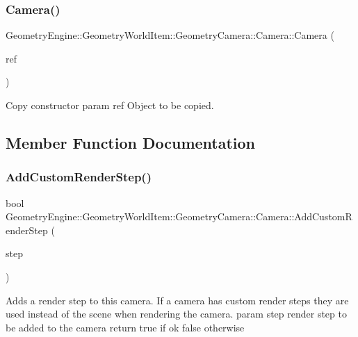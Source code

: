 \subsubsection{\texorpdfstring{Camera()}{Camera()}\hspace{0.1cm}{\footnotesize\ttfamily [2/2]}}
{\footnotesize\ttfamily Geometry\+Engine\+::\+Geometry\+World\+Item\+::\+Geometry\+Camera\+::\+Camera\+::\+Camera (\begin{DoxyParamCaption}\item[{const \mbox{\hyperlink{class_geometry_engine_1_1_geometry_world_item_1_1_geometry_camera_1_1_camera}{Camera}} \&}]{ref }\end{DoxyParamCaption})}

Copy constructor param ref Object to be copied. 

\subsection{Member Function Documentation}
\mbox{\label{class_geometry_engine_1_1_geometry_world_item_1_1_geometry_camera_1_1_camera_a548c5c566cc732b7d0c00aca94cdcbbe}} 
\subsubsection{\texorpdfstring{AddCustomRenderStep()}{AddCustomRenderStep()}}
{\footnotesize\ttfamily bool Geometry\+Engine\+::\+Geometry\+World\+Item\+::\+Geometry\+Camera\+::\+Camera\+::\+Add\+Custom\+Render\+Step (\begin{DoxyParamCaption}\item[{const \mbox{\hyperlink{class_geometry_engine_1_1_geometry_render_step_1_1_render_step}{Geometry\+Render\+Step\+::\+Render\+Step}} \&}]{step }\end{DoxyParamCaption})\hspace{0.3cm}{\ttfamily [virtual]}}

Adds a render step to this camera. If a camera has custom render steps they are used instead of the scene when rendering the camera. param step render step to be added to the camera return true if ok false otherwise \mbox{\label{class_geometry_engine_1_1_geometry_world_item_1_1_geometry_camera_1_1_camera_aefeabe0fe7650e0b6236b59134058845}} 
